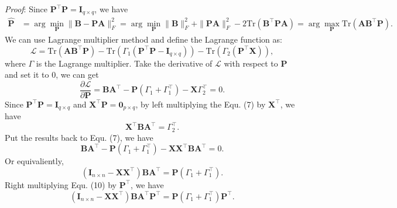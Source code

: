 \documentclass[titlepage,11pt,twoside]{article}
\begin{document}
\emph{Proof}:
Since $\mathbf{P}^{\top}\mathbf{P} = \mathbf{I}_{q\times q}$, we have
\begin{equation}
\begin{split}
\mathbf{\hat{P}}
&
=\arg\min_{\mathbf{P}}\|\mathbf{B}-\mathbf{P}\mathbf{A}\|_{F}^{2}
=\arg\min_{\mathbf{P}}\|\mathbf{B}\|_{F}^{2}+\|\mathbf{P}\mathbf{A}\|_{F}^{2}-2\text{Tr}(\mathbf{B}^{\top}\mathbf{P}\mathbf{A})
=\arg\max_{\mathbf{P}}\text{Tr}(\mathbf{A}\mathbf{B}^{\top}\mathbf{P}).
\end{split}
\end{equation}
We can use Lagrange multiplier method and define the Lagrange function as:
\begin{equation}
\mathcal{L}
=
\text{Tr}(\mathbf{A}\mathbf{B}^{\top}\mathbf{P})
-
\text{Tr}(\Gamma_{1}(\mathbf{P}^{\top}\mathbf{P} - \mathbf{I}_{q\times q}))
-
\text{Tr}(\Gamma_{2}(\mathbf{P}^{\top}\mathbf{X}))
,
\end{equation}
where $\Gamma$ is the Lagrange multiplier. Take the derivative of $\mathcal{L}$ with respect to $\mathbf{P}$ and set it to 0, we can get
\begin{equation}
\frac{\partial \mathcal{L}}{\partial \mathbf{P}} 
=
\mathbf{B}\mathbf{A}^{\top}
-
\mathbf{P}(\Gamma_{1}+\Gamma_{1}^{\top})
-
\mathbf{X}\Gamma_{2}^{\top}
=
0.
\end{equation}
Since $\mathbf{P}^{\top}\mathbf{P}=\mathbf{I}_{q\times q}$ and $\mathbf{X}^{\top}\mathbf{P} = \mathbf{0}_{p\times q}$, by left multiplying the Equ. (7) by $\mathbf{X}^{\top}$, we have 
\begin{equation}
\mathbf{X}^{\top}\mathbf{B}\mathbf{A}^{\top}
=
\Gamma_{2}^{\top}.
\end{equation}
Put the results back to Equ. (7), we have 
\begin{equation}
\mathbf{B}\mathbf{A}^{\top}
-
\mathbf{P}(\Gamma_{1}+\Gamma_{1}^{\top})
-
\mathbf{X}\mathbf{X}^{\top}\mathbf{B}\mathbf{A}^{\top}
=
0.
\end{equation}
Or equivaliently, 
\begin{equation}
(\mathbf{I}_{n\times n}-\mathbf{X}\mathbf{X}^{\top})\mathbf{B}\mathbf{A}^{\top}
=
\mathbf{P}(\Gamma_{1}+\Gamma_{1}^{\top}).
\end{equation}
Right multiplying Equ. (10) by $\mathbf{P}^{\top}$, we have
\begin{equation}
(\mathbf{I}_{n\times n}-\mathbf{X}\mathbf{X}^{\top})\mathbf{B}\mathbf{A}^{\top}\mathbf{P}^{\top}
=
\mathbf{P}(\Gamma_{1}+\Gamma_{1}^{\top})\mathbf{P}^{\top}
.
\end{equation}
\end{document}
